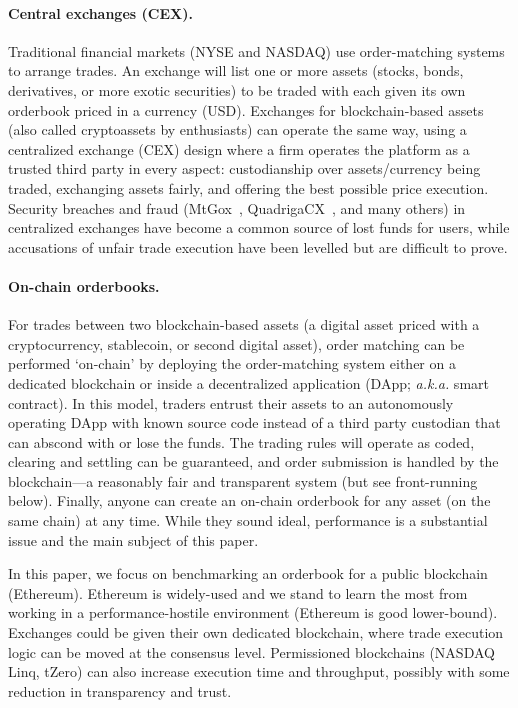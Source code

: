 \paragraph{Central exchanges (CEX).} Traditional financial markets (\eg NYSE and NASDAQ) use order-matching systems to arrange trades. An exchange will list one or more assets (stocks, bonds, derivatives, or more exotic securities) to be traded with each given its own orderbook priced in a currency (\eg USD). Exchanges for blockchain-based assets (also called cryptoassets by enthusiasts) can operate the same way, using a centralized exchange (CEX) design where a firm operates the platform as a trusted third party in every aspect: custodianship over assets/currency being traded, exchanging assets fairly, and offering the best possible price execution. Security breaches and fraud (\eg MtGox~\cite{TheHisto45:online}, QuadrigaCX~\cite{SEBIOrde83:online}, and many others) in centralized exchanges have become a common source of lost funds for users, while accusations of unfair trade execution have been levelled but are difficult to prove. 

\paragraph{On-chain orderbooks.} For trades between two blockchain-based assets (\eg a digital asset priced with a cryptocurrency, stablecoin, or second digital asset), order matching can be performed `on-chain' by deploying the order-matching system either on a dedicated blockchain or inside a decentralized application (DApp; \textit{a.k.a.} smart contract). In this model, traders entrust their assets to an autonomously operating DApp with known source code instead of a third party custodian that can abscond with or lose the funds. The trading rules will operate as coded, clearing and settling can be guaranteed, and order submission is handled by the blockchain---a reasonably fair and transparent system (but see front-running below). Finally, anyone can create an on-chain orderbook for any asset (on the same chain) at any time. While they sound ideal, performance is a substantial issue and the main subject of this paper. 

In this paper, we focus on benchmarking an orderbook for a public blockchain (\eg Ethereum). Ethereum is widely-used and we stand to learn the most from working in a performance-hostile environment (\ie Ethereum is good lower-bound). Exchanges could be given their own dedicated blockchain, where trade execution logic can be moved at the consensus level. Permissioned blockchains (\eg NASDAQ Linq, tZero) can also increase execution time and throughput, possibly with some reduction in transparency and trust.

